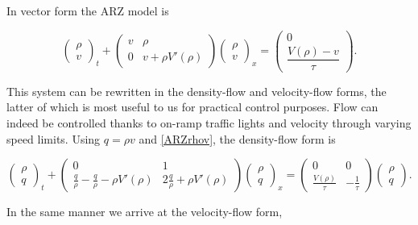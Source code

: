 \documentclass[review]{elsarticle}
\begin{document}
In vector form the ARZ model is

\begin{equation} \label{ARZrhov}
\begin{pmatrix}
\rho \\ v
\end{pmatrix}_t
+ \begin{pmatrix}
v & \rho \\
0 & v + \rho V' (\rho)
\end{pmatrix}
\begin{pmatrix}
\rho \\ v
\end{pmatrix}_x = 
\begin{pmatrix}
0 \\ \dfrac{V(\rho) - v}{\tau}
\end{pmatrix}.
\end{equation}

This system can be rewritten in the density-flow and velocity-flow forms, the latter of which is most useful to us for practical control purposes. Flow can indeed be controlled thanks to on-ramp traffic lights and velocity through varying speed limits. Using $q = \rho v$ and \eqref{ARZrhov}, the density-flow form is

\begin{equation} \label{ARZrhoq}
\begin{pmatrix}
\rho \\ q
\end{pmatrix}_t
+ \begin{pmatrix}
0 & 1 \\
\frac{q}{\rho}  -\frac{q}{\rho} - \rho V'(\rho) & 2\frac{q}{\rho} + \rho V'(\rho)
\end{pmatrix}
\begin{pmatrix}
\rho \\ q
\end{pmatrix}_x = 
\begin{pmatrix}
0 & 0 \\ 
\frac{V(\rho)}{\tau} & -\frac{1}{\tau}
\end{pmatrix} 
\begin{pmatrix}
\rho \\ q
\end{pmatrix}.
\end{equation}

In the same manner we arrive at the velocity-flow form,
\end{document}
